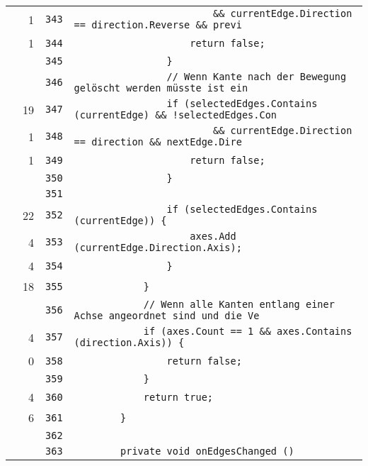 \documentclass[a4paper,10pt]{article}
\begin{document}
\begin{longtable}[l]{lrrl}
\cellcolor{green} & 1 & \verb~343~ & \verb~                        && currentEdge.Direction == direction.Reverse && previ~\\
\cellcolor{green} & 1 & \verb~344~ & \verb~                    return false;~\\
\cellcolor{gray} &  & \verb~345~ & \verb~                }~\\
\cellcolor{gray} &  & \verb~346~ & \verb~                // Wenn Kante nach der Bewegung gelöscht werden müsste ist ein~\\
\cellcolor{green} & 19 & \verb~347~ & \verb~                if (selectedEdges.Contains (currentEdge) && !selectedEdges.Con~\\
\cellcolor{green} & 1 & \verb~348~ & \verb~                        && currentEdge.Direction == direction && nextEdge.Dire~\\
\cellcolor{green} & 1 & \verb~349~ & \verb~                    return false;~\\
\cellcolor{gray} &  & \verb~350~ & \verb~                }~\\
\cellcolor{gray} &  & \verb~351~ & \verb~~\\
\cellcolor{green} & 22 & \verb~352~ & \verb~                if (selectedEdges.Contains (currentEdge)) {~\\
\cellcolor{green} & 4 & \verb~353~ & \verb~                    axes.Add (currentEdge.Direction.Axis);~\\
\cellcolor{green} & 4 & \verb~354~ & \verb~                }~\\
\cellcolor{green} & 18 & \verb~355~ & \verb~            }~\\
\cellcolor{gray} &  & \verb~356~ & \verb~            // Wenn alle Kanten entlang einer Achse angeordnet sind und die Ve~\\
\cellcolor{green} & 4 & \verb~357~ & \verb~            if (axes.Count == 1 && axes.Contains (direction.Axis)) {~\\
\cellcolor{red} & 0 & \verb~358~ & \verb~                return false;~\\
\cellcolor{gray} &  & \verb~359~ & \verb~            }~\\
\cellcolor{green} & 4 & \verb~360~ & \verb~            return true;~\\
\cellcolor{green} & 6 & \verb~361~ & \verb~        }~\\
\cellcolor{gray} &  & \verb~362~ & \verb~~\\
\cellcolor{gray} &  & \verb~363~ & \verb~        private void onEdgesChanged ()~\\

\end{longtable}
\end{document}
